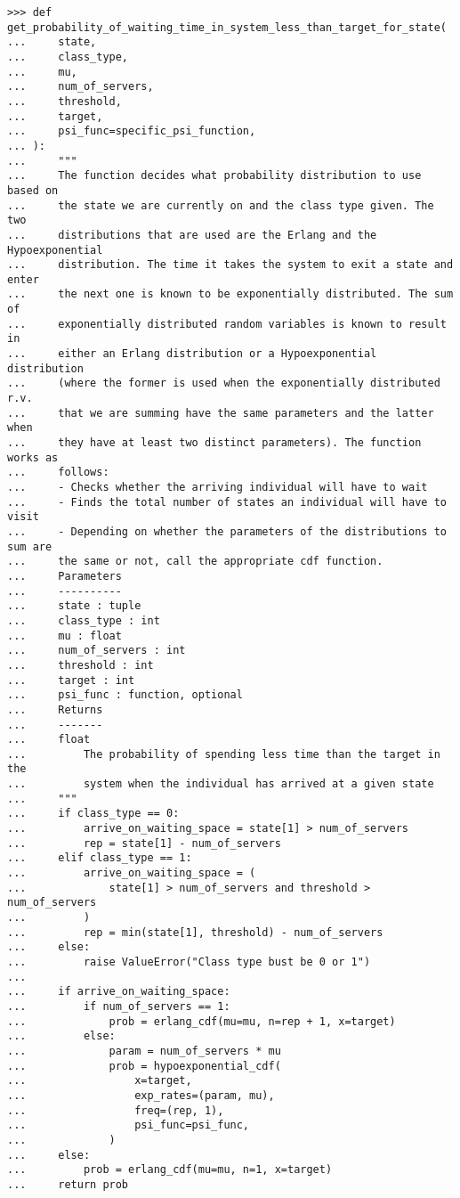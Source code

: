 \begin{lstlisting}[style=pystyle]
>>> def get_probability_of_waiting_time_in_system_less_than_target_for_state(
...     state,
...     class_type,
...     mu,
...     num_of_servers,
...     threshold,
...     target,
...     psi_func=specific_psi_function,
... ):
...     """
...     The function decides what probability distribution to use based on
...     the state we are currently on and the class type given. The two
...     distributions that are used are the Erlang and the Hypoexponential
...     distribution. The time it takes the system to exit a state and enter
...     the next one is known to be exponentially distributed. The sum of
...     exponentially distributed random variables is known to result in
...     either an Erlang distribution or a Hypoexponential distribution
...     (where the former is used when the exponentially distributed r.v.
...     that we are summing have the same parameters and the latter when
...     they have at least two distinct parameters). The function works as
...     follows:
...     - Checks whether the arriving individual will have to wait
...     - Finds the total number of states an individual will have to visit
...     - Depending on whether the parameters of the distributions to sum are
...     the same or not, call the appropriate cdf function.
...     Parameters
...     ----------
...     state : tuple
...     class_type : int
...     mu : float
...     num_of_servers : int
...     threshold : int
...     target : int
...     psi_func : function, optional
...     Returns
...     -------
...     float
...         The probability of spending less time than the target in the
...         system when the individual has arrived at a given state
...     """
...     if class_type == 0:
...         arrive_on_waiting_space = state[1] > num_of_servers
...         rep = state[1] - num_of_servers
...     elif class_type == 1:
...         arrive_on_waiting_space = (
...             state[1] > num_of_servers and threshold > num_of_servers
...         )
...         rep = min(state[1], threshold) - num_of_servers
...     else:
...         raise ValueError("Class type bust be 0 or 1")
... 
...     if arrive_on_waiting_space:
...         if num_of_servers == 1:
...             prob = erlang_cdf(mu=mu, n=rep + 1, x=target)
...         else:
...             param = num_of_servers * mu
...             prob = hypoexponential_cdf(
...                 x=target,
...                 exp_rates=(param, mu),
...                 freq=(rep, 1),
...                 psi_func=psi_func,
...             )
...     else:
...         prob = erlang_cdf(mu=mu, n=1, x=target)
...     return prob

\end{lstlisting}

